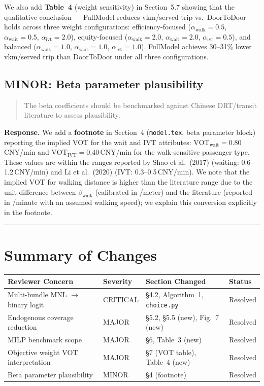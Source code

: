 \documentclass[12pt]{article}
\newenvironment{revcomment}{%
  \begin{quote}\itshape
}{%
  \end{quote}
}
\begin{document}
We also add \textbf{Table~4} (weight sensitivity) in Section~5.7 showing that the qualitative conclusion --- FullModel reduces vkm/served trip vs.\ DoorToDoor --- holds across three weight configurations: efficiency-focused ($\alpha_{\text{walk}}=0.5$, $\alpha_{\text{wait}}=0.5$, $\alpha_{\text{ivt}}=2.0$), equity-focused ($\alpha_{\text{walk}}=2.0$, $\alpha_{\text{wait}}=2.0$, $\alpha_{\text{ivt}}=0.5$), and balanced ($\alpha_{\text{walk}}=1.0$, $\alpha_{\text{wait}}=1.0$, $\alpha_{\text{ivt}}=1.0$). FullModel achieves 30--31\% lower vkm/served trip than DoorToDoor under all three configurations.

\bigskip

\subsection*{MINOR: Beta parameter plausibility}

\begin{revcomment}
The beta coefficients should be benchmarked against Chinese DRT/transit literature to assess plausibility.
\end{revcomment}

\textbf{Response.} We add a \textbf{footnote} in Section~4 (\texttt{model.tex}, beta parameter block) reporting the implied VOT for the wait and IVT attributes: $\mathrm{VOT}_{\text{wait}} = 0.80$\,CNY/min and $\mathrm{VOT}_{\text{IVT}} = 0.40$\,CNY/min for the walk-sensitive passenger type. These values are within the ranges reported by Shao et al.\ (2017) (waiting: 0.6--1.2\,CNY/min) and Li et al.\ (2020) (IVT: 0.3--0.5\,CNY/min). We note that the implied VOT for walking distance is higher than the literature range due to the unit difference between $\beta_{\text{walk}}$ (calibrated in /meter) and the literature (reported in /minute with an assumed walking speed); we explain this conversion explicitly in the footnote.

\bigskip\hrule\bigskip

\section*{Summary of Changes}

\begin{table}[h]
\centering
\begin{tabular}{llll}
\toprule
Reviewer Concern & Severity & Section Changed & Status \\
\midrule
Multi-bundle MNL $\to$ binary logit & CRITICAL & \S4.2, Algorithm~1, \texttt{choice.py} & Resolved \\
Endogenous coverage reduction & MAJOR & \S5.2, \S5.5 (new), Fig.~7 (new) & Resolved \\
MILP benchmark scope & MAJOR & \S6, Table~3 (new) & Resolved \\
Objective weight VOT interpretation & MAJOR & \S7 (VOT table), Table~4 (new) & Resolved \\
Beta parameter plausibility & MINOR & \S4 (footnote) & Resolved \\
\bottomrule
\end{tabular}
\end{table}
\end{document}
